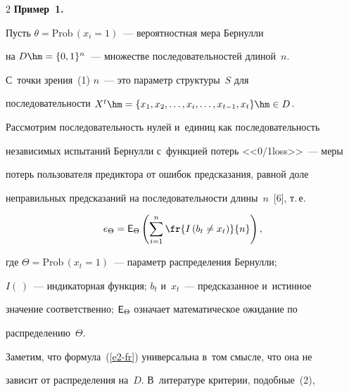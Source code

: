 \begin{multicols}{2}
  \textbf{Пример~1.}


  


  Пусть $\theta = \mathrm{Prob}\,(x_i = 1)$~--- вероятностная мера Бернулли 


на $D\hm=\{0,1\}^n$~--- множестве последовательностей длиной~$n$. 


С~точки зрения~(1) $n$~--- это параметр структуры~$S$ для 


последовательности $X^t\hm =\{x_1, x_2, \ldots , x_i,\ldots, x_{t-1}, x_t\}\hm\in 


D$. 


  


  Рассмотрим последовательность нулей и~единиц как последовательность 


независимых испытаний Бернулли с~функцией потерь <<0/1loss>>~--- меры 


потерь пользователя предиктора от ошибок предсказания, равной доле 


неправильных предсказаний на последовательности длины~$n$~[6], т.\,е.


  \begin{equation}


  e_{\Theta} = {\sf E}_\Theta \left(\sum\limits_{i=1}^n \fr{I\left(b_t \not=x_t\right)}{n}\right),


  \label{e2-fr}


  \end{equation}


  


  \vspace*{-3pt}


  


  \noindent


где $\Theta=\mathrm{Prob}\,(x_t = 1)$~--- параметр распределения Бернулли; 


$I(\,)$~--- индикаторная функция; $b_t$ и~$x_t$~--- предсказанное и~истинное 


значение соответственно; ${\sf E}_\Theta$ означает математическое ожидание по 


распределению~$\Theta$.





  Заметим, что формула~(\ref{e2-fr}) универсальна в~том смысле, что она не 


зависит от распределения на~$D$. В~литературе критерии, подобные~(2), 



\end{multicols}
